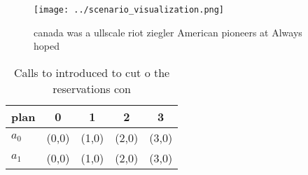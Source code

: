 \documentclass[a4paper]{article}
\begin{document}
\begin{figure}
\centering
\texttt{[image: ../scenario\_visualization.png]}
\caption{ canada was a ullscale riot ziegler American pioneers at Always hoped
}
\end{figure}
 
\begin{table}
\begin{adjustbox}{width=0.7\columnwidth}
\begin{tabular}{|l|l|l|l|l|}
\hline
\textbf{plan} & \multicolumn{1}{c|}{\textbf{0}} & \multicolumn{1}{c|}{\textbf{1}} & \multicolumn{1}{c|}{\textbf{2}} & \multicolumn{1}{c|}{\textbf{3}} \\ \hline
\textbf{$a_0$}  & (0,0) & (1,0) & (2,0) & (3,0) \\ \hline
\textbf{$a_1$}  & (0,0) & (1,0) & (2,0) & (3,0) \\ \hline
\end{tabular}
\end{adjustbox}
\caption{Calls to introduced to cut o the reservations con
}
\end{table}
\end{document}

